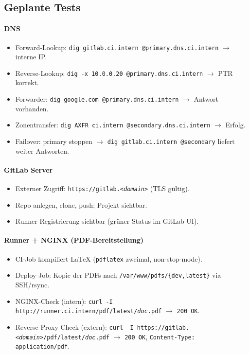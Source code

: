 \documentclass[a4paper,12pt]{article}
\begin{document}
\subsection*{Geplante Tests}

\paragraph{DNS}
\begin{itemize}
  \item Forward-Lookup: \texttt{dig gitlab.ci.intern @primary.dns.ci.intern} \(\to\) interne IP.
  \item Reverse-Lookup: \texttt{dig -x 10.0.0.20 @primary.dns.ci.intern} \(\to\) PTR korrekt.
  \item Forwarder: \texttt{dig google.com @primary.dns.ci.intern} \(\to\) Antwort vorhanden.
  \item Zonentransfer: \texttt{dig AXFR ci.intern @secondary.dns.ci.intern} \(\to\) Erfolg.
  \item Failover: primary stoppen \(\to\) \texttt{dig gitlab.ci.intern @secondary} liefert weiter Antworten.
\end{itemize}

\paragraph{GitLab Server}
\begin{itemize}
  \item Externer Zugriff: \texttt{https://gitlab.\emph{<domain>}} (TLS gültig).
  \item Repo anlegen, clone, push; Projekt sichtbar.
  \item Runner-Registrierung sichtbar (grüner Status im GitLab-UI).
\end{itemize}

\paragraph{Runner + NGINX (PDF-Bereitstellung)}
\begin{itemize}
  \item CI-Job kompiliert \LaTeX{} (\texttt{pdflatex} zweimal, non-stop-mode).
  \item Deploy-Job: Kopie der PDFs nach \texttt{/var/www/pdfs/\{dev,latest\}} via SSH/rsync.
  \item NGINX-Check (intern): \texttt{curl -I http://runner.ci.intern/pdf/latest/\emph{doc}.pdf} \(\to\) \texttt{200 OK}.
  \item Reverse-Proxy-Check (extern): \texttt{curl -I https://gitlab.\emph{<domain>}/pdf/latest/\emph{doc}.pdf} \(\to\) \texttt{200 OK}, \texttt{Content-Type: application/pdf}.
\end{itemize}
\end{document}
